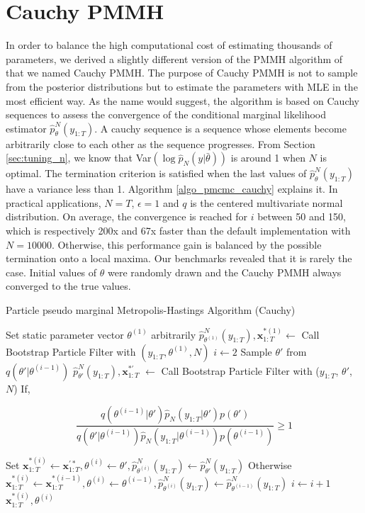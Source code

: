 \documentclass[11pt,a4,twosided,singlespacing,titlepagenumber=on]{scrreprt}
\numberwithin{equation}{chapter} %
\theoremstyle{remark}
\newcommand{\matr}[1]{\mathbf{#1}}
\begin{document}
\section{Cauchy PMMH}
\label{app:cauchy_pmmh}
In order to balance the high computational cost of estimating thousands of parameters, we derived a slightly different version of the PMMH algorithm of \cite{andrieu2010} that we named Cauchy PMMH. The purpose of Cauchy PMMH is not to sample from the posterior distributions but to estimate the parameters with MLE in the most efficient way. As the name would suggest, the algorithm is based on Cauchy sequences to assess the convergence of the conditional marginal likelihood estimator $\hat{p}^N_{\theta}(y_{1:T})$. A cauchy sequence is a sequence whose elements become arbitrarily close to each other as the sequence progresses. From Section \ref{sec:tuning_n}, we know that Var$(\log \hat{p}_N(y|\bar{\theta}))$ is around 1 when $N$ is optimal. The termination criterion is satisfied when the last values of $\hat{p}^N_{\theta}(y_{1:T})$ have a variance less than 1. Algorithm \ref{algo_pmcmc_cauchy} explains it. In practical applications, $N = T$, $\epsilon = 1$ and $q$ is the centered multivariate normal distribution. On average, the convergence is reached for $i$ between 50 and 150, which is respectively 200x and 67x faster than the default implementation with $N = 10000$. Otherwise, this performance gain is balanced by the possible termination onto a local maxima. Our benchmarks revealed that it is rarely the case. Initial values of $\theta$ were randomly drawn and the Cauchy PMMH always converged to the true values.

\begin{algorithm}[H]
\caption{Particle pseudo marginal Metropolis-Hastings Algorithm (Cauchy)}\label{algo_pmcmc_cauchy}
\begin{algorithmic}[1]
\State Set static parameter vector $\theta^{(1)}$ arbitrarily
\State $\hat{p}^N_{\theta^{(1)}}(y_{1:T}), \matr{x}^{*(1)}_{1:T} \gets$ Call Bootstrap Particle Filter with $(y_{1:T}, \theta^{(1)}, N)$
\State $i \gets 2$
	\State Sample $\theta'$ from $q(\theta'|\theta^{(i-1)})$
	\State $\hat{p}^N_{\theta'}(y_{1:T}), \matr{x}^{*'}_{1:T}$ $ \gets$ Call Bootstrap Particle Filter with ($y_{1:T}$, $\theta'$, $N$)
	\State If,
	
	$$\frac{q(\theta^{(i-1)}|\theta')\hat{p}_N(y_{1:T}|\theta')p(\theta')}{q(\theta'|\theta^{(i-1)})\hat{p}_N(y_{1:T}|\theta^{(i-1)})p(\theta^{(i-1)})} \geq 1$$
	
	\State Set $\matr{x}^{*(i)}_{1:T} \gets \matr{x}^{'*}_{1:T},\theta^{(i)} \gets \theta', \hat{p}^N_{\theta^{(i)}}(y_{1:T}) \gets \hat{p}^N_{\theta'}(y_{1:T})$
	\State Otherwise $\matr{x}^{*(i)}_{1:T} \gets \matr{x}^{*(i-1)}_{1:T},\theta^{(i)} \gets \theta^{(i-1)}, \hat{p}^N_{\theta^{(i)}}(y_{1:T}) \gets \hat{p}^N_{\theta^{(i-1)}}(y_{1:T})$
	\State $i \gets i + 1$
\\
\EndProcedure
\Return $\matr{x}^{*(i)}_{1:T}, \theta^{(i)}$

\end{algorithmic}
\end{algorithm}
\end{document}
